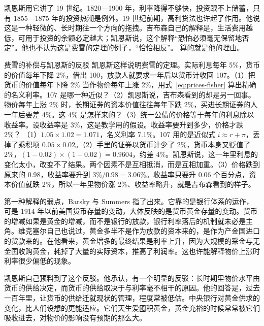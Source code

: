 凯恩斯用它讲了 19 世纪。1820—1900 年，利率降得不够快，投资跟不上储蓄，只有 1855—1875 年的投资热潮是例外\cite{keynes1930}。19 世纪前期，高利贷法也许起了作用\cite{keynes1930}。他说这是一种轻微的、长时期往一个方向的拖拽\cite{keynes1930}。吉布森自己的解释是，生活费用越低，可用于投资的余额必定越大；凯恩斯说，这个解释“恐怕必须毫无保留地否定”\cite{keynes1930}。他也不认为这是费雪的定理的例子，“恰恰相反”\cite{keynes1930}。 算的就是他的理由。

\begin{example}{费雪的补偿与凯恩斯的反驳}\label{ex:wicksell-keynes}
凯恩斯这样说明费雪的定理。实际利息每年 5\%，货币的价值每年下降 2\%，借出 100，放款人就要求一年后以货币计收回 107\cite{keynes1930}。（1）把货币的价值每年下降 2\% 当作物价每年上涨 2\%，用式~\eqref{eq:prices-fisher} 算出精确的名义利率。107 是哪一种近似？（2）凯恩斯说，吉布森看到的却是另一回事。物价每年上涨 2\% 时，长期证券的资本价值往往每年下跌 2\%，买进长期证券的人一年后要差 4\%\cite{keynes1930}。这 4\% 是怎样来的？（3）统一公债的价格等于每年的利息除以收益率。设收益率是 3\%，这是教学用的假设。收益率要升到多少，价格才跌 2\%？
\solution （1）$1.05\times1.02=1.071$，名义利率 7.1\%。107 用的是近似式 $i\approx r+\pi$，丢掉了乘积项 $0.05\times0.02$。（2）手里的证券以货币计少了 2\%，货币本身又贬值了 2\%，$(1-0.02)\times(1-0.02)=0.9604$，约差 4\%。凯恩斯说，这一年里利息的变化太小，改变不了结果\cite{keynes1930}。两个因素不是互相抵消，而是互相加重。（3）价格跌到原来的 0.98，收益率要升到 $3\%/0.98=3.06\%$。收益率只要升 0.06 个百分点，资本价值就跌 2\%，所以一年里物价涨 2\%、收益率略升，就是吉布森看到的样子。
\end{example}

第一种解释的弱点，Barsky 与 Summers 指了出来。它靠的是银行体系的运作，可是 1914 年以前美国货币存量的变动，大体反映的是货币黄金存量的变动\cite{barsky1985}。货币的增减如果是黄金的增减，而不是银行的放款，银行利率落后的机制就未必是主角。维克塞尔自己也说过，黄金多半不是作为放款的资本来的，是作为产金国进口的货款来的\cite{wicksell1907}。在他看来，黄金增多的最终结果是利率上升，因为大规模的采金与无金国收购黄金，耗掉了大量的实际资本，推高了利润率\cite{wicksell1907}。这也许能解释物价上涨时利率很少偏低的现象\cite{wicksell1907}。

凯恩斯自己预料到了这个反驳。他承认，有一个明显的反驳：长时期里物价水平由货币的供给决定，而货币的供给取决于与利率毫不相干的原因\cite{keynes1930}。他的回答是，过去一百年里，让货币的供给迁就现状的管理，程度常被低估\cite{keynes1930}。中央银行对黄金供求的变化，比人们设想的更能适应\cite{keynes1930}。它们天生爱囤积黄金，黄金充裕的时候常常被它们吸收进去，对物价的影响没有预期的那么大\cite{keynes1930}。

